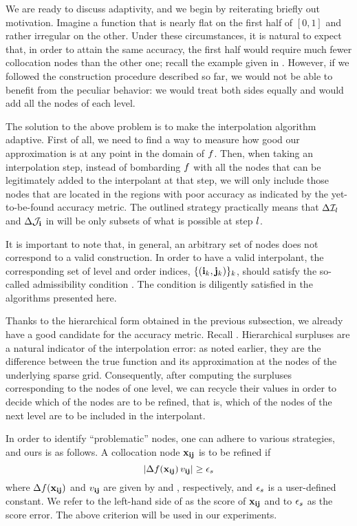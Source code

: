 We are ready to discuss adaptivity, and we begin by reiterating briefly out
motivation. Imagine a function that is nearly flat on the first half of $[0, 1]$
and rather irregular on the other. Under these circumstances, it is natural to
expect that, in order to attain the same accuracy, the first half would require
much fewer collocation nodes than the other one; recall the example given in
. However, if we followed the construction procedure described
so far, we would not be able to benefit from the peculiar behavior: we would
treat both sides equally and would add all the nodes of each level.

The solution to the above problem is to make the interpolation algorithm
adaptive. First of all, we need to find a way to measure how good our
approximation is at any point in the domain of $f$. Then, when taking an
interpolation step, instead of bombarding $f$ with all the nodes that can be
legitimately added to the interpolant at that step, we will only include those
nodes that are located in the regions with poor accuracy as indicated by the
yet-to-be-found accuracy metric. The outlined strategy practically means that
$\Delta\mathcal{I}_l$ and $\Delta\mathcal{J}_{\mathbf{i}}$ in  will
be only subsets of what is possible at step $l$.

\begin{remark}
It is important to note that, in general, an arbitrary set of nodes does not
correspond to a valid construction. In order to have a valid interpolant, the
corresponding set of level and order indices, $\{ (\mathbf{i}_k, \mathbf{j}_k) \}_k$, should
satisfy the so-called admissibility condition \cite{jakeman2012, klimke2006}.
The condition is diligently satisfied in the algorithms presented here.
\end{remark}

Thanks to the hierarchical form obtained in the previous subsection, we already
have a good candidate for the accuracy metric. Recall .
Hierarchical surpluses are a natural indicator of the interpolation error: as
noted earlier, they are the difference between the true function and its
approximation at the nodes of the underlying sparse grid. Consequently, after
computing the surpluses corresponding to the nodes of one level, we can recycle
their values in order to decide which of the nodes are to be refined, that is,
which of the nodes of the next level are to be included in the interpolant.

In order to identify ``problematic'' nodes, one can adhere to various
strategies, and ours is as follows. A collocation node $\mathbf{x}_{\mathbf{i}\mathbf{j}}$ is to be
refined if
\begin{equation} \elab{serror}
  \left| \surplus(\vx_{\vi\vj}) \, \w_{\vi\vj} \right| \ge \serror
\end{equation}
where $\Delta f(\mathbf{x}_{\mathbf{i}\mathbf{j}})$ and $v_{\mathbf{i}\mathbf{j}}$ are given by  and
, respectively, and $\epsilon_s$ is a user-defined constant. We refer
to the left-hand side of  as the score of $\mathbf{x}_{\mathbf{i}\mathbf{j}}$ and to
$\epsilon_s$ as the score error. The above criterion will be used in our
experiments.

